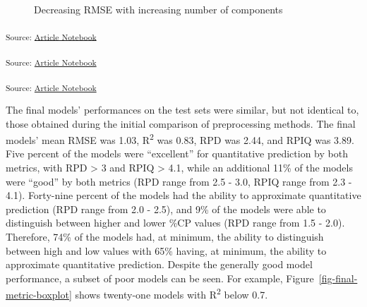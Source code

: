 \documentclass[
]{agujournal2019}
\begin{document}
\label{cell-fig-model-calibration}
\begin{figure}[H]


\caption{\label{fig-model-calibration}Decreasing RMSE with increasing
number of components}

\end{figure}%

\textsubscript{Source:
\href{https://rvcrawford.github.io/glowing-system/index.qmd.html}{Article
Notebook}}

\textsubscript{Source:
\href{https://rvcrawford.github.io/glowing-system/index.qmd.html}{Article
Notebook}}

\textsubscript{Source:
\href{https://rvcrawford.github.io/glowing-system/index.qmd.html}{Article
Notebook}}

The final models' performances on the test sets were similar, but not
identical to, those obtained during the initial comparison of
preprocessing methods. The final models' mean RMSE was 1.03,
R\textsuperscript{2} was 0.83, RPD was 2.44, and RPIQ was 3.89. Five
percent of the models were ``excellent'' for quantitative prediction by
both metrics, with RPD \textgreater{} 3 and RPIQ \textgreater{} 4.1,
while an additional 11\% of the models were ``good'' by both metrics
(RPD range from 2.5 - 3.0, RPIQ range from 2.3 - 4.1). Forty-nine
percent of the models had the ability to approximate quantitative
prediction (RPD range from 2.0 - 2.5), and 9\% of the models were able
to distinguish between higher and lower \%CP values (RPD range from 1.5
- 2.0). Therefore, 74\% of the models had, at minimum, the ability to
distinguish between high and low values with 65\% having, at minimum,
the ability to approximate quantitative prediction. Despite the
generally good model performance, a subset of poor models can be seen.
For example, Figure~\ref{fig-final-metric-boxplot} shows twenty-one
models with R\textsuperscript{2} below 0.7.
\end{document}
